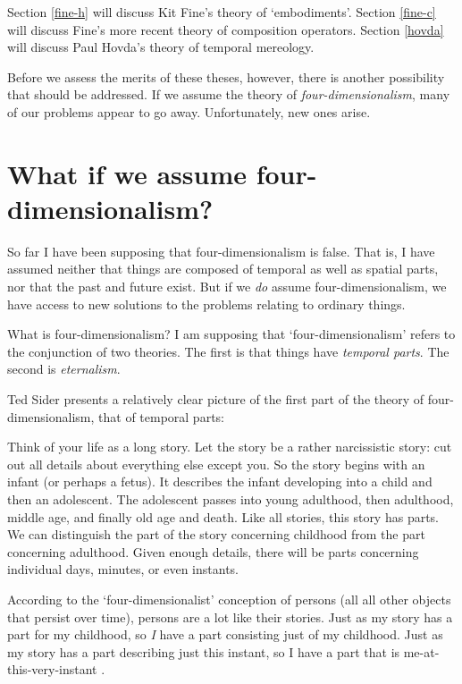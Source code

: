 \documentclass[11pt]{article}
\newenvironment{squote}{%
\begin{spacing}{1}
\begin{list}{}{%
\setlength{\labelwidth}{0pt}%
\rightmargin\leftmargin%
}
\item\relax
}{%
\end{list}%
\end{spacing}
}
\begin{document}
\begin{spacing}{1.5}
Section \ref{fine-h} will discuss Kit Fine's theory of `embodiments'.
Section \ref{fine-c} will discuss Fine's more recent theory of
composition operators.  Section \ref{hovda} will discuss Paul Hovda's
theory of temporal mereology.

Before we assess the merits of these theses, however, there is another
possibility that should be addressed.  If we assume the theory of {\em
  four-dimensionalism}, many of our problems appear to go away.
Unfortunately, new ones arise.

\section{What if we assume four-dimensionalism?}
\label{4d}
So far I have been supposing that four-dimensionalism is false.  That
is, I have assumed neither that things are composed of temporal as
well as spatial parts, nor that the past and future exist.  But if we
{\em do} assume four-dimensionalism, we have access to new solutions
to the problems relating to ordinary things.

What is four-dimensionalism?  I am supposing that
`four-dimensionalism' refers to the conjunction of two theories.  The
first is that things have {\em temporal parts}.  The second is {\em
  eternalism}.

Ted Sider presents a relatively clear picture of the first part of the
theory of four-dimensionalism, that of temporal parts:

\begin{squote}
Think of your life as a long story.  Let the story be a rather
narcissistic story: cut out all details about everything else except
you.  So the story begins with an infant (or perhaps a fetus).  It
describes the infant developing into a child and then an adolescent.
The adolescent passes into young adulthood, then adulthood, middle
age, and finally old age and death.  Like all stories, this story has
parts.  We can distinguish the part of the story concerning childhood
from the part concerning adulthood.  Given enough details, there will
be parts concerning individual days, minutes, or even instants.

According to the `four-dimensionalist' conception of persons (all all
other objects that persist over time), persons are a lot like their
stories.  Just as my story has a part for my childhood, so {\em I}
have a part consisting just of my childhood.  Just as my story has a
part describing just this instant, so I have a part that is
me-at-this-very-instant \citeyearpar[1]{sider2001}.
\end{squote}


\end{spacing}
\end{document}
